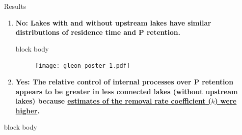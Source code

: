 \documentclass[final,hyperref={pdfpagelabels=false}]{beamer}
\begin{document}
\begin{frame}[t]
\begin{columns}[t]
\begin{column}{.465\textwidth}
% 
% 
% 

\vspace{0.5em}

\begin{block}{Results}
\begin{enumerate}
\item \textbf{No: Lakes with and without upstream lakes have similar distributions of residence time and P retention.}

\vspace{0.5em}

{
\begin{beamercolorbox}[wd=\textwidth,rounded=true]{block body}

\begin{figure}
  \texttt{[image: gleon\_poster\_1.pdf]}
\end{figure}

\end{beamercolorbox}
}

\vspace{0.5em}

\item \textbf{Yes: The relative control of internal processes over P retention appears to be greater in less connected lakes (without upstream lakes) because \ul{estimates of the removal rate coefficient ($k$) were higher}.}
\end{enumerate}

\vspace{0.5em}

{
\begin{beamercolorbox}[wd=\textwidth,rounded=true]{block body}


\end{beamercolorbox}}
\end{block}
\end{column}
\end{columns}
\end{frame}
\end{document}
